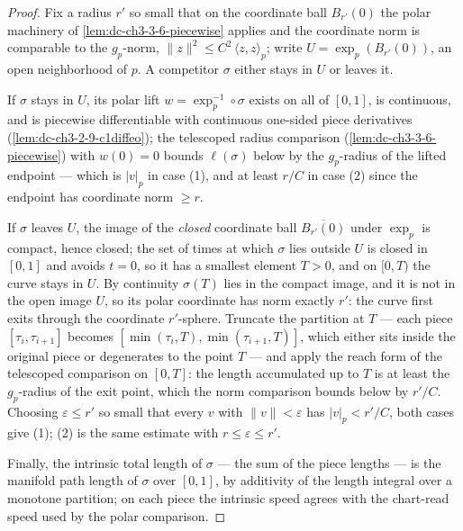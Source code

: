\begin{proof}
  \sketch
  \leanok
  Fix a radius $r'$ so small that on the coordinate ball $B_{r'}(0)$ the
  polar machinery of \cref{lem:dc-ch3-3-6-piecewise} applies and the
  coordinate norm is comparable to the $g_p$-norm, $\|z\|^2\le C^2\,
  \langle z,z\rangle_p$; write $U=\exp_p(B_{r'}(0))$, an open neighborhood of
  $p$. A competitor $\sigma$ either stays in $U$ or leaves it.

  If $\sigma$ stays in $U$, its polar lift $w=\exp_p^{-1}\circ\sigma$ exists
  on all of $[0,1]$, is continuous, and is piecewise differentiable with
  continuous one-sided piece derivatives (\cref{lem:dc-ch3-2-9-c1diffeo});
  the telescoped radius comparison (\cref{lem:dc-ch3-3-6-piecewise}) with
  $w(0)=0$ bounds $\ell(\sigma)$ below by the $g_p$-radius of the lifted
  endpoint — which is $|v|_p$ in case (1), and at least $r/C$ in case (2)
  since the endpoint has coordinate norm $\ge r$.

  If $\sigma$ leaves $U$, the image of the \emph{closed} coordinate ball
  $\overline{B_{r'}(0)}$ under $\exp_p$ is compact, hence closed; the set of
  times at which $\sigma$ lies outside $U$ is closed in $[0,1]$ and avoids
  $t=0$, so it has a smallest element $T>0$, and on $[0,T)$ the curve stays
  in $U$. By continuity $\sigma(T)$ lies in the compact image, and it is not
  in the open image $U$, so its polar coordinate has norm exactly $r'$: the
  curve first exits through the coordinate $r'$-sphere. Truncate the
  partition at $T$ — each piece $[\tau_i,\tau_{i+1}]$ becomes
  $[\min(\tau_i,T),\min(\tau_{i+1},T)]$, which either sits inside the
  original piece or degenerates to the point $T$ — and apply the reach form
  of the telescoped comparison on $[0,T]$: the length accumulated up to $T$
  is at least the $g_p$-radius of the exit point, which the norm comparison
  bounds below by $r'/C$. Choosing $\varepsilon\le r'$ so small that every
  $v$ with $\|v\|<\varepsilon$ has $|v|_p<r'/C$, both cases give (1); (2) is
  the same estimate with $r\le\varepsilon\le r'$.

  Finally, the intrinsic total length of $\sigma$ — the sum of the piece
  lengths — is the manifold path length of $\sigma$ over $[0,1]$, by
  additivity of the length integral over a monotone partition; on each piece
  the intrinsic speed agrees with the chart-read speed used by the polar
  comparison.
\end{proof}

